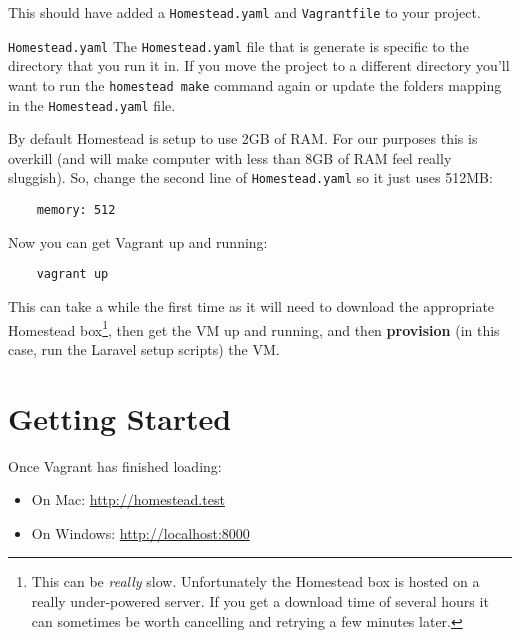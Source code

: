 This should have added a \texttt{Homestead.yaml} and \texttt{Vagrantfile} to your project.
\\

\begin{infobox}{\texttt{Homestead.yaml}}
    The \texttt{Homestead.yaml} file that is generate is specific to the directory that you run it in. If you move the project to a different directory you'll want to run the \texttt{homestead make} command again or update the folders mapping in the \texttt{Homestead.yaml} file.
\end{infobox}

By default Homestead is setup to use 2GB of RAM. For our purposes this is overkill (and will make computer with less than 8GB of RAM feel really sluggish). So, change the second line of \texttt{Homestead.yaml} so it just uses 512MB:

\begin{verbatim}
    memory: 512
\end{verbatim}

Now you can get Vagrant up and running:

\begin{verbatim}
    vagrant up
\end{verbatim}

This can take a while the first time as it will need to download the appropriate Homestead box\footnote{This can be \textit{really} slow. Unfortunately the Homestead box is hosted on a really under-powered server. If you get a download time of several hours it can sometimes be worth cancelling and retrying a few minutes later.}, then get the VM up and running, and then \textbf{provision} (in this case, run the Laravel setup scripts) the VM.


\pagebreak


\section{Getting Started}

Once Vagrant has finished loading:

\begin{itemize}
    \item On Mac: \href{http://homestead.test}{http://homestead.test}
    \item On Windows: \href{http://localhost:8000}{http://localhost:8000}
\end{itemize}


